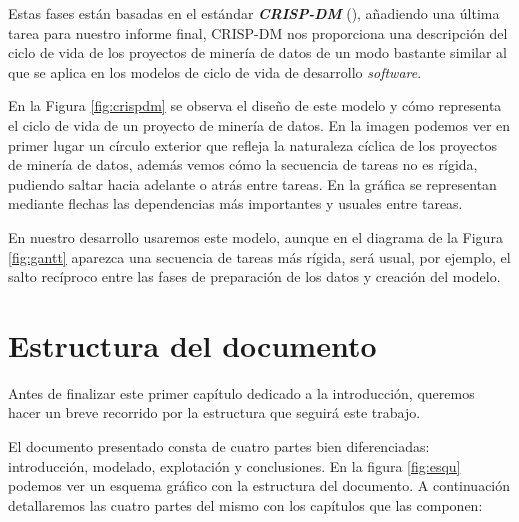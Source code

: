 Estas fases están basadas en el estándar \textbf{\textit{CRISP-DM}} (\cite{crispdm}), añadiendo una última tarea para nuestro informe final, CRISP-DM nos proporciona una descripción del ciclo de vida de los proyectos de minería de datos de un modo bastante similar al que se aplica en los modelos de ciclo de vida de desarrollo \textit{software}.


 

En la Figura \ref{fig:crispdm} se observa el diseño de este modelo y cómo representa el ciclo de vida de un proyecto de minería de datos. En la imagen podemos ver en primer lugar un círculo exterior que refleja la naturaleza cíclica de los proyectos de minería de datos, además vemos cómo la secuencia de tareas no es rígida, pudiendo saltar hacia adelante o atrás entre tareas. En la gráfica se representan mediante flechas las dependencias más importantes y usuales entre tareas.

En nuestro desarrollo usaremos este modelo, aunque en el diagrama de la Figura \ref{fig:gantt} aparezca una secuencia de tareas más rígida, será usual, por ejemplo, el salto recíproco entre las fases de preparación de los datos y creación del modelo.


\section{Estructura del documento}
\label{section:intro:estructura}
Antes de finalizar este primer capítulo dedicado a la introducción, queremos hacer un breve recorrido por la estructura que seguirá este trabajo.


El documento presentado  consta de cuatro partes bien diferenciadas: introducción, modelado, explotación y conclusiones. En la figura \ref{fig:esqu} podemos ver un esquema gráfico con la estructura del documento.  A continuación detallaremos las cuatro partes del mismo con los capítulos que las componen: 

